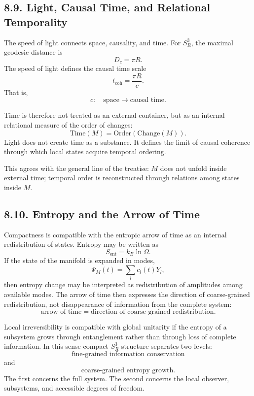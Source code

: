 \documentclass[12pt,a4paper]{article}
\theoremstyle{definition}
\begin{document}
\subsection*{8.9. Light, Causal Time, and Relational Temporality}

The speed of light connects space, causality, and time. For \(S^3_R\), the maximal geodesic distance is
\[
D_c=\pi R.
\]
The speed of light defines the causal time scale
\[
t_{\mathrm{coh}}=\frac{\pi R}{c}.
\]
That is,
\[
c:\quad \text{space}\to \text{causal time}.
\]

Time is therefore not treated as an external container, but as an internal relational measure of the order of changes:
\[
\mathrm{Time}(M)=\mathrm{Order}(\mathrm{Change}(M)).
\]
Light does not create time as a substance. It defines the limit of causal coherence through which local states acquire temporal ordering.

This agrees with the general line of the treatise: \(M\) does not unfold inside external time; temporal order is reconstructed through relations among states inside \(M\).

\subsection*{8.10. Entropy and the Arrow of Time}

Compactness is compatible with the entropic arrow of time as an internal redistribution of states. Entropy may be written as
\[
S_{\mathrm{ent}}=k_B\ln\Omega.
\]
If the state of the manifold is expanded in modes,
\[
\Psi_M(t)=\sum_l c_l(t)Y_l,
\]
then entropy change may be interpreted as redistribution of amplitudes among available modes. The arrow of time then expresses the direction of coarse-grained redistribution, not disappearance of information from the complete system:
\[
\text{arrow of time}
=
\text{direction of coarse-grained redistribution}.
\]

Local irreversibility is compatible with global unitarity if the entropy of a subsystem grows through entanglement rather than through loss of complete information. In this sense compact \(S^3_R\)-structure separates two levels:
\[
\text{fine-grained information conservation}
\]
and
\[
\text{coarse-grained entropy growth}.
\]
The first concerns the full system. The second concerns the local observer, subsystems, and accessible degrees of freedom.
\end{document}
